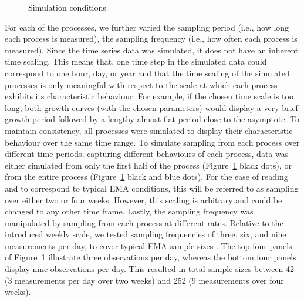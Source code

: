 \documentclass[man, floatsintext]{apa7}
\begin{document}
\begin{figure}[!t]
  \caption{Simulation conditions}
  \label{fig:exemplar_pn}
\end{figure}

For each of the processes, we further varied the sampling period (i.e., how
long each process is measured), the sampling frequency (i.e., how often each
process is measured). Since the time series data was simulated, it does not
have an inherent time scaling. This means that, one time step in the simulated
data could correspond to one hour, day, or year and that the time scaling of
the simulated processes is only meaningful with respect to the scale at which
each process exhibits its characteristic behaviour. For example, if the chosen
time scale is too long, both growth curves (with the chosen parameters) would
display a very brief growth period followed by a lengthy almost flat period
close to the asymptote. To maintain consistency, all processes were simulated
to display their characteristic behaviour over the same time range. To simulate
sampling from each process over different time periods, capturing different
behaviours of each process, data was either simulated from only the first half
of the process (Figure~\ref{fig:exemplar_pn} black dots), or from the entire
process (Figure~\ref{fig:exemplar_pn} black and blue dots). For the ease of
reading and to correspond to typical EMA conditions, this will be referred to
as sampling over either two or four weeks. However, this scaling is arbitrary
and could be changed to any other time frame. Lastly, the sampling frequency
was manipulated by sampling from each process at different rates. Relative to
the introduced weekly scale, we tested sampling frequencies of three, six, and
nine measurements per day, to cover typical EMA sample sizes
\parencite{wrzus_ecological_2023}. The top four panels of
Figure~\ref{fig:exemplar_pn} illustrate three observations per day, whereas the
bottom four panels display nine observations per day. This resulted in total
sample sizes between 42 (3 measurements per day over two weeks) and 252 (9
measurements over four weeks).
\end{document}
